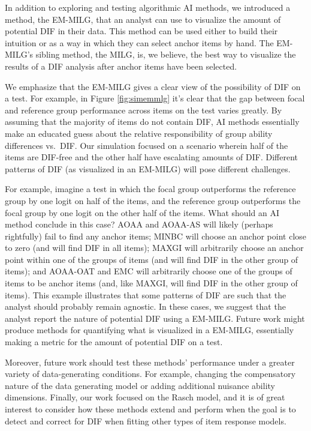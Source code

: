 \documentclass[
  11pt,
]{article}
\begin{document}
In addition to exploring and testing algorithmic AI methods, we introduced a method, the EM-MILG, that an analyst can use to visualize the amount of potential DIF in their data. This method can be used either to build their intuition or as a way in which they can select anchor items by hand. The EM-MILG's sibling method, the MILG, is, we believe, the best way to visualize the results of a DIF analysis after anchor items have been selected.

We emphasize that the EM-MILG gives a clear view of the possibility of DIF on a test. For example, in Figure \ref{fig:simemmlg} it's clear that the gap between focal and reference group performance across items on the test varies greatly. By assuming that the majority of items do not contain DIF, AI methods essentially make an educated guess about the relative responsibility of group ability differences vs.~DIF. Our simulation focused on a scenario wherein half of the items are DIF-free and the other half have escalating amounts of DIF. Different patterns of DIF (as visualized in an EM-MILG) will pose different challenges.

For example, imagine a test in which the focal group outperforms the reference group by one logit on half of the items, and the reference group outperforms the focal group by one logit on the other half of the items. What should an AI method conclude in this case? AOAA and AOAA-AS will likely (perhaps rightfully) fail to find any anchor items; MINBC will choose an anchor point close to zero (and will find DIF in all items); MAXGI will arbitrarily choose an anchor point within one of the groups of items (and will find DIF in the other group of items); and AOAA-OAT and EMC will arbitrarily choose one of the groups of items to be anchor items (and, like MAXGI, will find DIF in the other group of items). This example illustrates that some patterns of DIF are such that the analyst should probably remain agnostic. In these cases, we suggest that the analyst report the nature of potential DIF using a EM-MILG. Future work might produce methods for quantifying what is visualized in a EM-MILG, essentially making a metric for the amount of potential DIF on a test.

Moreover, future work should test these methods' performance under a greater variety of data-generating conditions. For example, changing the compensatory nature of the data generating model or adding additional nuisance ability dimensions. Finally, our work focused on the Rasch model, and it is of great interest to consider how these methods extend and perform when the goal is to detect and correct for DIF when fitting other types of item response models.
\end{document}
